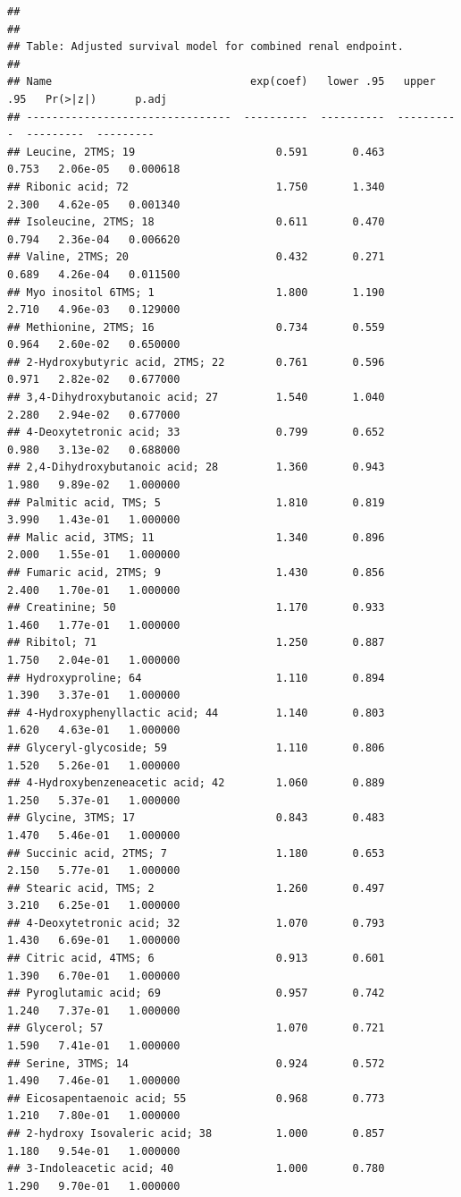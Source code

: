 \documentclass[]{article}
\begin{document}
\begin{verbatim}
## 
## 
## Table: Adjusted survival model for combined renal endpoint.
## 
## Name                               exp(coef)   lower .95   upper .95   Pr(>|z|)      p.adj
## --------------------------------  ----------  ----------  ----------  ---------  ---------
## Leucine, 2TMS; 19                      0.591       0.463       0.753   2.06e-05   0.000618
## Ribonic acid; 72                       1.750       1.340       2.300   4.62e-05   0.001340
## Isoleucine, 2TMS; 18                   0.611       0.470       0.794   2.36e-04   0.006620
## Valine, 2TMS; 20                       0.432       0.271       0.689   4.26e-04   0.011500
## Myo inositol 6TMS; 1                   1.800       1.190       2.710   4.96e-03   0.129000
## Methionine, 2TMS; 16                   0.734       0.559       0.964   2.60e-02   0.650000
## 2-Hydroxybutyric acid, 2TMS; 22        0.761       0.596       0.971   2.82e-02   0.677000
## 3,4-Dihydroxybutanoic acid; 27         1.540       1.040       2.280   2.94e-02   0.677000
## 4-Deoxytetronic acid; 33               0.799       0.652       0.980   3.13e-02   0.688000
## 2,4-Dihydroxybutanoic acid; 28         1.360       0.943       1.980   9.89e-02   1.000000
## Palmitic acid, TMS; 5                  1.810       0.819       3.990   1.43e-01   1.000000
## Malic acid, 3TMS; 11                   1.340       0.896       2.000   1.55e-01   1.000000
## Fumaric acid, 2TMS; 9                  1.430       0.856       2.400   1.70e-01   1.000000
## Creatinine; 50                         1.170       0.933       1.460   1.77e-01   1.000000
## Ribitol; 71                            1.250       0.887       1.750   2.04e-01   1.000000
## Hydroxyproline; 64                     1.110       0.894       1.390   3.37e-01   1.000000
## 4-Hydroxyphenyllactic acid; 44         1.140       0.803       1.620   4.63e-01   1.000000
## Glyceryl-glycoside; 59                 1.110       0.806       1.520   5.26e-01   1.000000
## 4-Hydroxybenzeneacetic acid; 42        1.060       0.889       1.250   5.37e-01   1.000000
## Glycine, 3TMS; 17                      0.843       0.483       1.470   5.46e-01   1.000000
## Succinic acid, 2TMS; 7                 1.180       0.653       2.150   5.77e-01   1.000000
## Stearic acid, TMS; 2                   1.260       0.497       3.210   6.25e-01   1.000000
## 4-Deoxytetronic acid; 32               1.070       0.793       1.430   6.69e-01   1.000000
## Citric acid, 4TMS; 6                   0.913       0.601       1.390   6.70e-01   1.000000
## Pyroglutamic acid; 69                  0.957       0.742       1.240   7.37e-01   1.000000
## Glycerol; 57                           1.070       0.721       1.590   7.41e-01   1.000000
## Serine, 3TMS; 14                       0.924       0.572       1.490   7.46e-01   1.000000
## Eicosapentaenoic acid; 55              0.968       0.773       1.210   7.80e-01   1.000000
## 2-hydroxy Isovaleric acid; 38          1.000       0.857       1.180   9.54e-01   1.000000
## 3-Indoleacetic acid; 40                1.000       0.780       1.290   9.70e-01   1.000000
\end{verbatim}
\end{document}
